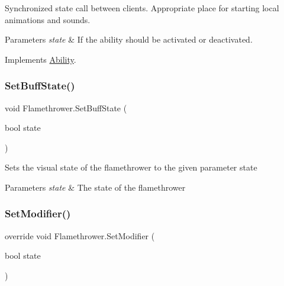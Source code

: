 Synchronized state call between clients. Appropriate place for starting local animations and sounds. 


\begin{DoxyParams}{Parameters}
{\em state} & If the ability should be activated or deactivated.\\
\hline
\end{DoxyParams}


Implements \hyperlink{class_ability_a10f7f3c2b63eeef6e352aee48d246384}{Ability}.

\hypertarget{class_flamethrower_a5cdec1a136398627fb280f251834ff54}{}\label{class_flamethrower_a5cdec1a136398627fb280f251834ff54} 
\subsubsection{\texorpdfstring{Set\+Buff\+State()}{SetBuffState()}}
{\footnotesize\ttfamily void Flamethrower.\+Set\+Buff\+State (\begin{DoxyParamCaption}\item[{bool}]{state }\end{DoxyParamCaption})}



Sets the visual state of the flamethrower to the given parameter state 


\begin{DoxyParams}{Parameters}
{\em state} & The state of the flamethrower\\
\hline
\end{DoxyParams}
\hypertarget{class_flamethrower_a839995136fda8bb0ea556f3a1443253b}{}\label{class_flamethrower_a839995136fda8bb0ea556f3a1443253b} 
\subsubsection{\texorpdfstring{Set\+Modifier()}{SetModifier()}}
{\footnotesize\ttfamily override void Flamethrower.\+Set\+Modifier (\begin{DoxyParamCaption}\item[{bool}]{state }\end{DoxyParamCaption})\hspace{0.3cm}{\ttfamily [virtual]}}



